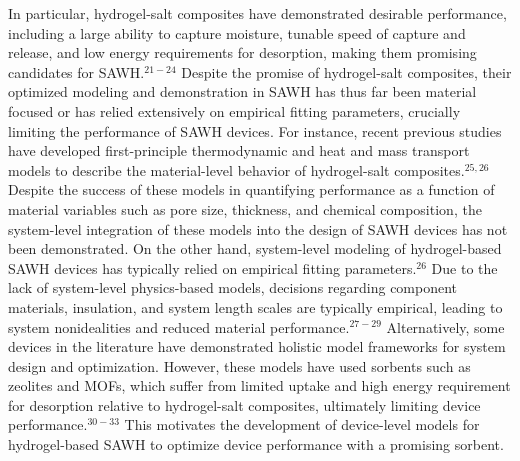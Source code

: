 \documentclass[11pt]{article}
\begin{document}
In particular, hydrogel-salt composites have demonstrated desirable performance, including a large ability to capture moisture, tunable speed of capture and release, and low energy requirements for desorption, making them promising candidates for SAWH.$^{21-24}$ Despite the promise of hydrogel-salt composites, their optimized modeling and demonstration in SAWH has thus far been material focused or has relied extensively on empirical fitting parameters, crucially limiting the performance of SAWH devices. For instance, recent previous studies have developed first-principle thermodynamic and heat and mass transport models to describe the material-level behavior of hydrogel-salt composites.$^{25,26}$ Despite the success of these models in quantifying performance as a function of material variables such as pore size, thickness, and chemical composition, the system-level integration of these models into the design of SAWH devices has not been demonstrated. On the other hand, system-level modeling of hydrogel-based SAWH devices has typically relied on empirical fitting parameters.$^{26}$ Due to the lack of system-level physics-based models, decisions regarding component materials, insulation, and system length scales are typically empirical, leading to system nonidealities and reduced material performance.$^{27-29}$ Alternatively, some devices in the literature have demonstrated holistic model frameworks for system design and optimization. However, these models have used sorbents such as zeolites and MOFs, which suffer from limited uptake and high energy requirement for desorption relative to hydrogel-salt composites, ultimately limiting device performance.$^{30-33}$ This motivates the development of device-level models for hydrogel-based SAWH to optimize device performance with a promising sorbent.
\end{document}
